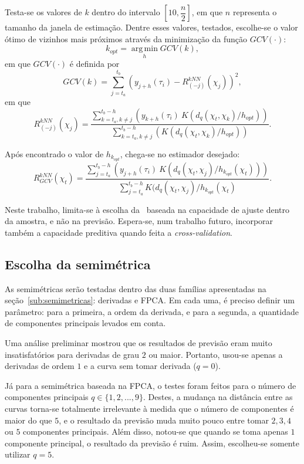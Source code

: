 \documentclass[
	12pt,				%
	openright,			%
	oneside,			%
	a4paper,			%
	english,			%
	brazil				%
	]{dissertacao-ufrgs-abntex2}
\begin{document}
\begin{description}
Testa-se os valores de $k$ dentro do intervalo $[10,\dfrac{n}{2}]$, em que $n$ representa o tamanho da janela de estimação. Dentre esses valores, testados, escolhe-se o valor ótimo de vizinhos mais próximos através da minimização da função $GCV(\cdot)$:
\[k_{opt} = \operatorname*{arg\,min}_h GCV(k),\]
em que $GCV(\cdot)$ é definida por
\[
GCV(k) = \sum \limits_{j=t_a}^{t_b} \left(  y_{j+h}(\tau_i) - R_{(-j)}^{kNN}(\chi_j)  \right)^2, 
\]
em que
\[
R_{(-j)}^{kNN}(\chi_j) = 
\frac
	{\sum \limits_{k=t_a, k \neq j}^{t_b-h} \left( y_{k+h}(\tau_i)~ K(d_{q}(\chi_t,\chi_k)/h_{opt}) \right) }
	{\sum \limits_{k=t_a, k \neq j}^{t_b-h} \left( K(d_{q}(\chi_t,\chi_k)/h_{opt}) \right)  }.
\]


Após encontrado o valor de $h_{k_{opt}}$, chega-se no estimador desejado:
\[
R_{GCV}^{kNN}(\chi_t)=
\frac
	{\sum \limits_{j=t_a}^{t_b-h} \left( y_{j+h}(\tau_i)~ K(d_{q}(\chi_t,\chi_j)/h_{k_{opt}}(\chi_t)) \right) }
	{\sum \limits_{j=t_a}^{t_b-h} K(d_{q}(\chi_t,\chi_j)/h_{k_{opt}}(\chi_t) }.
\]


\end{description}

Neste trabalho, limita-se à escolha da \bw~baseada na capacidade de ajuste dentro da amostra, e não na previsão. Espera-se, num trabalho futuro, incorporar também a capacidade preditiva quando feita a \emph{cross-validation}. 

\subsection{Escolha da semimétrica}

As semimétricas serão testadas dentro das duas famílias apresentadas na seção~\ref{sub:semimetricas}: derivadas e FPCA. Em cada uma, é preciso definir um parâmetro: para a primeira, a ordem da derivada, e para a segunda, a quantidade de componentes principais levados em conta.

Uma análise preliminar mostrou que os resultados de previsão eram muito insatisfatórios para derivadas de grau $2$ ou maior. Portanto, usou-se apenas a derivadas de ordem $1$ e a curva sem tomar derivada ($q=0$).

Já para a semimétrica baseada na FPCA, o testes foram feitos para o número de componentes principais $q \in \{1, 2, ..., 9\}$. Destes, a mudança na distância entre as curvas torna-se totalmente irrelevante à medida que o número de componentes é maior do que $5$, e o resultado da previsão muda muito pouco entre tomar $2,3,4$ ou $5$ componentes principais. Além disso, notou-se que quando se toma apenas $1$ componente principal, o resultado da previsão é ruim. Assim, escolheu-se somente utilizar $q=5$.
\end{document}
